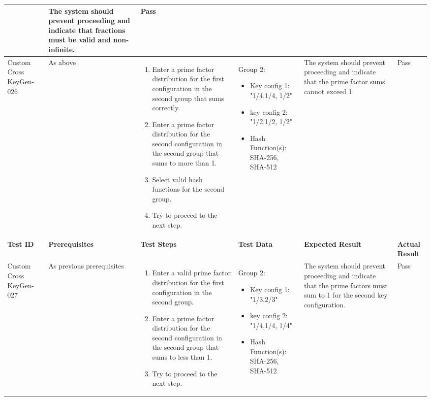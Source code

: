 \documentclass[]{final_report}
\theoremstyle{definition}
\begin{document}
\begin{longtable}{|p{1.5cm}|p{2.5cm}|p{3.5cm}|p{2.5cm}|p{3cm}|p{2cm}|}
    & The system should prevent proceeding and indicate that fractions must be valid and non-infinite. & Pass \\
  \hline
  Custom
  Cross
  KeyGen-026 & As above & 
  \begin{enumerate}
    \item Enter a prime factor distribution for the first configuration in the second group that sums correctly.
    \item Enter a prime factor distribution for the second configuration in the second group that sums to more than 1.
    \item Select valid hash functions for the second group.
    \item Try to proceed to the next step.
  \end{enumerate} & 
        Group 2: 
    \begin{itemize}
 \item Key config 1: "1/4,1/4,
 1/2"
 \item key config 2:  "1/2,1/2,
 1/2"
 \item Hash Function(s): SHA-256, SHA-512
    \end{itemize} 
   & The system should prevent proceeding and indicate that the prime factor sums cannot exceed 1. & Pass \\
  \hline
  \textbf{Test ID} & \textbf{Prerequisites} & \textbf{Test Steps} & \textbf{Test Data} & \textbf{Expected Result} & \textbf{Actual Result} \\
  \hline
  \hline
  Custom
  Cross
  KeyGen-027 & As previous prerequisites &
  \begin{enumerate}
    \item Enter a valid prime factor distribution for the first configuration in the second group.
    \item Enter a prime factor distribution for the second configuration in the second group that sums to less than 1.
    \item Try to proceed to the next step.
  \end{enumerate} & 
          Group 2: 
    \begin{itemize}
 \item Key config 1: "1/3,2/3"
 \item key config 2:  "1/4,1/4,
 1/4"
 \item Hash Function(s): SHA-256, SHA-512
    \end{itemize}
   & The system should prevent proceeding and indicate that the prime factors must sum to 1 for the second key configuration. & Pass \\

\end{longtable}
\end{document}
